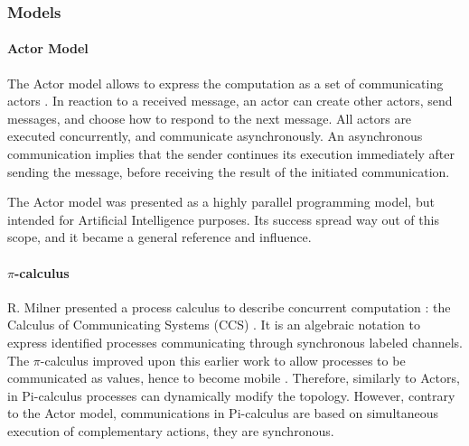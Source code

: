 
\subsubsection{Models}

\paragraph{Actor Model}

The Actor model allows to express the computation as a set of communicating actors \cite{Hewitt1973a, Hewitt1977, Clinger1981}.
In reaction to a received message, an actor can create other actors, send messages, and choose how to respond to the next message.
All actors are executed concurrently, and communicate asynchronously.
An asynchronous communication implies that the sender continues its execution immediately after sending the message, before receiving the result of the initiated communication.

The Actor model was presented as a highly parallel programming model, but intended for Artificial Intelligence purposes.
Its success spread way out of this scope, and it became a general reference and influence.


\paragraph{$\pi$-calculus}

R. Milner presented a process calculus to describe concurrent computation : the Calculus of Communicating Systems (CCS) \cite{Milner1975, Milner1980}.
It is an algebraic notation to express identified processes communicating through synchronous labeled channels.
The $\pi$-calculus improved upon this earlier work to allow processes to be communicated as values, hence to become mobile \cite{Engberg1986,Milner1992a,Milner1992}.
Therefore, similarly to Actors, in Pi-calculus processes can dynamically modify the topology.
However, contrary to the Actor model, communications in Pi-calculus are based on simultaneous execution of complementary actions, they are synchronous.


